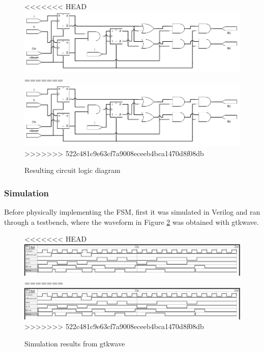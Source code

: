 \begin{figure}[H]
    \begin{center}
<<<<<<< HEAD
        \includegraphics[width=\linewidth]{../Exercise1/Moore/report/circuit.png}
=======
        \includegraphics[width=\linewidth]{./circuit.png}
>>>>>>> 522c481c9e63cf7a9008eceeb4bca1470d8f08db
        \caption{Resulting circuit logic diagram}
        \label{fig:moore_circuit}
    \end{center}
\end{figure}

\subsubsection{\color{orange}Simulation}

Before physically implementing the FSM, first it was simulated in Verilog and ran through a testbench, 
where the waveform in Figure \ref{fig:moore_gtk} was obtained with gtkwave.

\begin{figure}[H]
    \begin{center}
<<<<<<< HEAD
        \includegraphics[width=\linewidth]{../Exercise1/Moore/report/gtkwave.png}
=======
        \includegraphics[width=\linewidth]{./gtkwave.png}
>>>>>>> 522c481c9e63cf7a9008eceeb4bca1470d8f08db
        \caption{Simulation results from gtkwave}
        \label{fig:moore_gtk}
    \end{center}
\end{figure}

